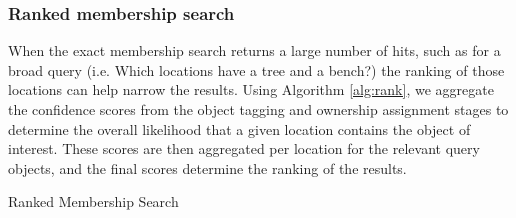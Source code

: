 \subsubsection{\textbf{Ranked membership search}}
When the exact membership search returns a large number of hits, such as for a broad query (i.e. Which locations have a tree and a bench?) the ranking of those locations can help narrow the results. Using Algorithm \ref{alg:rank}, we aggregate the confidence scores from the object tagging and ownership assignment stages to determine the overall likelihood that a given location contains the object of interest. These scores are then aggregated per location for the relevant query objects, and the final scores determine the ranking of the results. 

\begin{algorithm}[H]
    \caption{Ranked Membership Search}\label{alg:rank}
    \begin{algorithmic}
        \State{- - - - -}
                \EndFor
            \EndFor
        \EndProcedure
    \end{algorithmic}
\end{algorithm}


